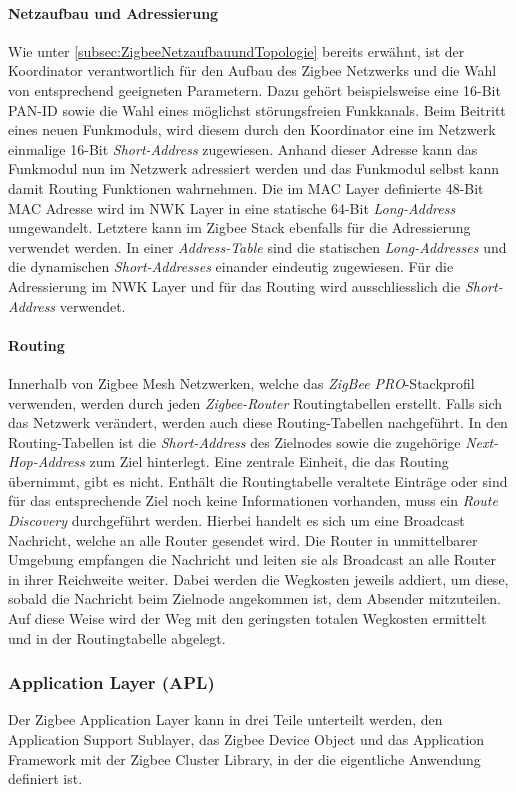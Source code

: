 \paragraph{Netzaufbau und Adressierung}
Wie unter \ref{subsec:ZigbeeNetzaufbauundTopologie} bereits erwähnt, ist der Koordinator verantwortlich für den Aufbau des Zigbee Netzwerks und die Wahl von entsprechend geeigneten Parametern.
Dazu gehört beispielsweise eine 16-Bit PAN-ID sowie die Wahl eines möglichst störungsfreien Funkkanals.
Beim Beitritt eines neuen Funkmoduls, wird diesem durch den Koordinator eine im Netzwerk einmalige 16-Bit \textit{Short-Address} zugewiesen.
Anhand dieser Adresse kann das Funkmodul nun im Netzwerk adressiert werden und das Funkmodul selbst kann damit Routing Funktionen wahrnehmen.
Die im MAC Layer definierte 48-Bit MAC Adresse wird im NWK Layer in eine statische 64-Bit \textit{Long-Address} umgewandelt.
Letztere kann im Zigbee Stack ebenfalls für die Adressierung verwendet werden.
In einer \textit{Address-Table} sind die statischen \textit{Long-Addresses} und die dynamischen \textit{Short-Addresses} einander eindeutig zugewiesen.
Für die Adressierung im NWK Layer und für das Routing wird ausschliesslich die \textit{Short-Address} verwendet.

\paragraph{Routing}
Innerhalb von Zigbee Mesh Netzwerken, welche das \textit{ZigBee PRO}-Stackprofil verwenden, werden durch jeden \textit{Zigbee-Router} Routingtabellen erstellt.
Falls sich das Netzwerk verändert, werden auch diese Routing-Tabellen nachgeführt.
In den Routing-Tabellen ist die \textit{Short-Address} des Zielnodes sowie die zugehörige \textit{Next-Hop-Address} zum Ziel hinterlegt.
Eine zentrale Einheit, die das Routing übernimmt, gibt es nicht.
Enthält die Routingtabelle veraltete Einträge oder sind für das entsprechende Ziel noch keine Informationen vorhanden, muss ein \textit{Route Discovery} durchgeführt werden.
Hierbei handelt es sich um eine Broadcast Nachricht, welche an alle Router gesendet wird.
Die Router in unmittelbarer Umgebung empfangen die Nachricht und leiten sie als Broadcast an alle Router in ihrer Reichweite weiter.
Dabei werden die Wegkosten jeweils addiert, um diese, sobald die Nachricht beim Zielnode angekommen ist, dem Absender mitzuteilen.
Auf diese Weise wird der Weg mit den geringsten totalen Wegkosten ermittelt und in der Routingtabelle abgelegt.


\subsubsection{Application Layer (APL)}\label{subsubsec:ApplicationLayer}
Der Zigbee Application Layer kann in drei Teile unterteilt werden, den Application Support Sublayer, das Zigbee Device Object und das Application Framework mit der Zigbee Cluster Library, in der die eigentliche Anwendung definiert ist.


